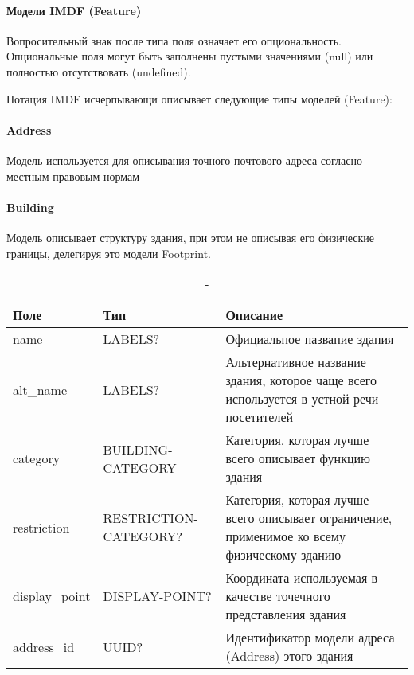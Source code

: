       \paragraph{Модели IMDF (Feature)}
        Вопросительный знак после типа поля означает его опциональность. Опциональные поля могут быть заполнены пустыми значениями (null) или полностью отсутствовать (undefined).

        Нотация IMDF исчерпывающи описывает следующие типы моделей (Feature):
      \paragraph{Address}
        Модель используется для описывания точного почтового адреса согласно местным правовым нормам

      \paragraph{Building}
        Модель описывает структуру здания, при этом не описывая его физические границы, делегируя это модели Footprint.

        \begin{center}
          \begin{xltabular}{\linewidth}{|l|p{4cm}|X|}
            \caption{-}\\\hline
            Поле           & Тип                   & Описание                                                                                     \\ \hline
            name           & LABELS?               & Официальное название здания                                                                  \\ \hline
            alt\_name      & LABELS?               & Альтернативное название здания, которое чаще всего используется в устной речи посетителей    \\ \hline
            category       & BUILDING-CATEGORY     & Категория, которая лучше всего описывает функцию здания                                      \\ \hline
            restriction    & RESTRICTION-CATEGORY? & Категория, которая лучше всего описывает ограничение, применимое ко всему физическому зданию \\ \hline
            display\_point & DISPLAY-POINT?        & Координата используемая в качестве точечного представления здания                            \\ \hline
            address\_id    & UUID?                 & Идентификатор модели адреса (Address) этого здания                                           \\ \hline
          \end{xltabular}
        \end{center}

